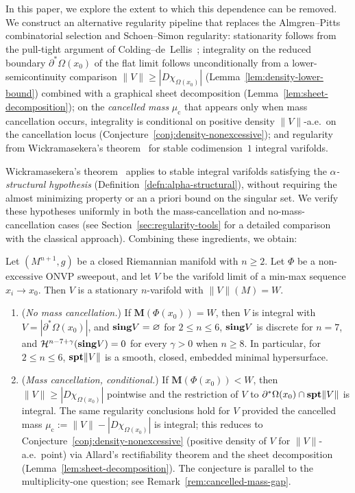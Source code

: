 In this paper, we explore the extent to which this dependence can be removed. We construct an alternative regularity pipeline that replaces the Almgren--Pitts combinatorial selection and Schoen--Simon regularity: stationarity follows from the pull-tight argument of Colding--de~Lellis~\cite{CL03}; integrality on the reduced boundary $\partial^*\Omega(x_0)$ of the flat limit follows unconditionally from a lower-semicontinuity comparison $\|V\| \geq |D\chi_{\Omega(x_0)}|$ (Lemma~\ref{lem:density-lower-bound}) combined with a graphical sheet decomposition (Lemma~\ref{lem:sheet-decomposition}); on the \emph{cancelled mass} $\mu_{\mathrm{c}}$ that appears only when mass cancellation occurs, integrality is conditional on positive density $\|V\|$-a.e.\ on the cancellation locus (Conjecture~\ref{conj:density-nonexcessive}); and regularity from Wickramasekera's theorem~\cite{Wic14} for stable codimension~$1$ integral varifolds.

Wickramasekera's theorem~\cite{Wic14} applies to stable integral varifolds satisfying the \emph{$\alpha$-structural hypothesis} (Definition~\ref{defn:alpha-structural}), without requiring the almost minimizing property or an a priori bound on the singular set. We verify these hypotheses uniformly in both the mass-cancellation and no-mass-cancellation cases (see Section~\ref{sec:regularity-tools} for a detailed comparison with the classical approach). Combining these ingredients, we obtain:

\begin{theorem}\label{thm:non-excessive-main}
    Let $(M^{n+1}, g)$ be a closed Riemannian manifold with $n \geq 2$. Let $\Phi$ be a non-excessive ONVP sweepout, and let $V$ be the varifold limit of a min-max sequence $x_i \to x_0$. Then $V$ is a stationary $n$-varifold with $\|V\|(M) = W$.
    \begin{enumerate}[label=\textup{(\alph*)}]
        \item (\emph{No mass cancellation.}) If $\mathbf{M}(\Phi(x_0)) = W$, then $V$ is integral with $V = |\partial^*\Omega(x_0)|$, and $\mathbf{sing} V = \varnothing$ for $2 \leq n \leq 6$, $\mathbf{sing} V$ is discrete for $n = 7$, and $\mathcal{H}^{n-7+\gamma}(\mathbf{sing} V) = 0$ for every $\gamma > 0$ when $n \geq 8$. In particular, for $2 \leq n \leq 6$, $\mathbf{spt}\|V\|$ is a smooth, closed, embedded minimal hypersurface.
        \item (\emph{Mass cancellation, conditional.}) If $\mathbf{M}(\Phi(x_0)) < W$, then $\|V\| \geq |D\chi_{\Omega(x_0)}|$ pointwise and the restriction of $V$ to $\partial^*\Omega(x_0) \cap \mathbf{spt}\|V\|$ is integral. The same regularity conclusions hold for $V$ provided the cancelled mass $\mu_{\mathrm{c}} := \|V\| - |D\chi_{\Omega(x_0)}|$ is integral; this reduces to Conjecture~\ref{conj:density-nonexcessive} (positive density of $V$ for $\|V\|$-a.e.\ point) via Allard's rectifiability theorem and the sheet decomposition (Lemma~\ref{lem:sheet-decomposition}). The conjecture is parallel to the multiplicity-one question; see Remark~\ref{rem:cancelled-mass-gap}.
    \end{enumerate}
\end{theorem}

